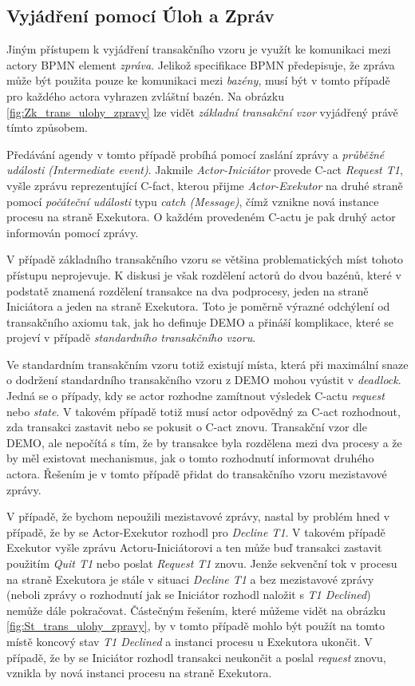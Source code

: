 \documentclass[]{article}
\begin{document}
\subsection{Vyjádření pomocí Úloh a Zpráv} \label{sec:tr_vzor_ulohy_zpravy}
Jiným přístupem k vyjádření transakčního vzoru je využít ke komunikaci mezi actory BPMN element \textit{zpráva}. Jelikož specifikace BPMN předepisuje, že zpráva může být použita pouze ke komunikaci mezi \textit{bazény}, musí být v tomto případě pro každého actora vyhrazen zvláštní bazén. Na obrázku \ref{fig:Zk_trans_ulohy_zpravy} lze vidět \textit{základní transakční vzor} vyjádřený právě tímto způsobem.

Předávání agendy v tomto případě probíhá pomocí zaslání zprávy a  \textit{průběžné události (Intermediate event)}. Jakmile \textit{Actor-Iniciátor} provede C-act \textit{Request T1}, vyšle zprávu reprezentující C-fact, kterou přijme \textit{Actor-Exekutor} na druhé straně pomocí \textit{počáteční události} typu \textit{catch (Message)}, čímž vznikne nová instance procesu na straně Exekutora. O každém provedeném C-actu je pak druhý actor informován pomocí zprávy. 

V případě základního transakčního vzoru se většina problematických míst tohoto přístupu neprojevuje. K diskusi je však rozdělení actorů do dvou bazénů, které v podstatě znamená rozdělení transakce na dva podprocesy, jeden na straně Iniciátora a jeden na straně Exekutora. Toto je poměrně výrazné odchýlení od transakčního axiomu tak, jak ho definuje DEMO a přináší komplikace, které se projeví v případě \textit{standardního transakčního vzoru}.

Ve standardním transakčním vzoru totiž existují místa, která při maximální snaze o dodržení standardního transakčního vzoru z DEMO mohou vyústit v \textit{deadlock}. Jedná se o případy, kdy se actor rozhodne zamítnout výsledek C-actu \textit{request} nebo \textit{state}. V takovém případě totiž musí actor odpovědný za C-act rozhodnout, zda transakci zastavit nebo se pokusit o C-act znovu. Transakční vzor dle DEMO, ale nepočítá s tím, že by transakce byla rozdělena mezi dva procesy a že by měl existovat mechanismus, jak o tomto rozhodnutí informovat druhého actora. Řešením je v tomto případě přidat do transakčního vzoru mezistavové zprávy.

V případě, že bychom nepoužili mezistavové zprávy, nastal by problém hned v případě, že by se Actor-Exekutor rozhodl pro \textit{Decline T1}. V takovém případě Exekutor vyšle zprávu Actoru-Iniciátorovi a ten může buď transakci zastavit použitím \textit{Quit T1} nebo poslat \textit{Request T1} znovu. Jenže sekvenční tok v procesu na straně Exekutora je stále v situaci \textit{Decline T1} a bez mezistavové zprávy (neboli zprávy o rozhodnutí jak se Iniciátor rozhodl naložit s \textit{T1 Declined}) nemůže dále pokračovat. Částečným řešením, které můžeme vidět na obrázku \ref{fig:St_trans_ulohy_zpravy}, by v tomto případě mohlo být použít na tomto místě koncový stav \textit{T1 Declined} a instanci procesu u Exekutora ukončit. V případě, že by se Iniciátor rozhodl transakci neukončit a poslal \textit{request} znovu, vznikla by nová instanci procesu na straně Exekutora.
\end{document}
